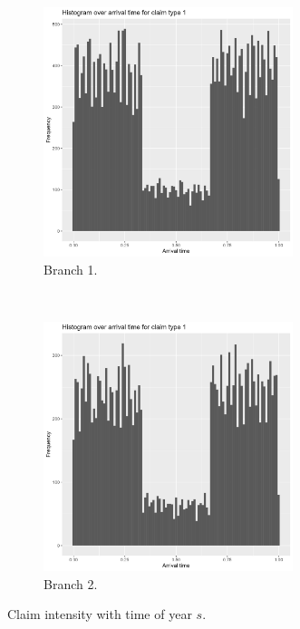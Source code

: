 \documentclass[11pt]{article}
\begin{document}
\begin{figure}[h!]
    \centering
    \begin{subfigure}[t]{0.5\textwidth}
        \centering
        \includegraphics[width=0.8\textwidth]{plots/claim_type1/histogram_arrivaltime_s.png}
        \caption{Branch 1.}
    \end{subfigure}%
    ~ 
    \begin{subfigure}[t]{0.5\textwidth}
        \centering
        \includegraphics[width=0.8\textwidth]{plots/claim_type2/histogram_arrivaltime_s.png}
        \caption{Branch 2.}
    \end{subfigure}
    \caption{Claim intensity with time of year $s$.}
    \label{a1:intensity}
\end{figure}
\end{document}
